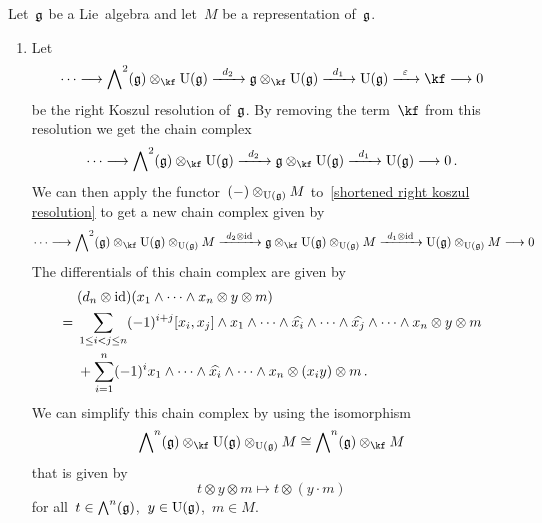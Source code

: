 \begin{construction}
	\label{lie algebra homology and cohomology via koszul complex}
	Let~$\mathfrak{g}$ be a Lie~algebra and let~$M$ be a representation of~$\mathfrak{g}$.
	\begin{enumerate}
		\item
			Let
			\[
				\dotsb
				\to
				\Exterior^2(\glie) \otimes_{\kf} \Univ(\glie)
				\xto{d_2}
				\glie \otimes_{\kf} \Univ(\glie)
				\xto{d_1}
				\Univ(\glie)
				\xto{\varepsilon}
				\kf
				\to
				0
			\]
			be the right Koszul resolution of~$\mathfrak{g}$.
			By removing the term~$\kf$ from this resolution we get the chain complex
			\begin{equation}
				\label{shortened right koszul resolution}
				\dotsb
				\to
				\Exterior^2(\glie) \otimes_{\kf} \Univ(\glie)
				\xto{d_2}
				\glie \otimes_{\kf} \Univ(\glie)
				\xto{d_1}
				\Univ(\glie)
				\to
				0 \,.
			\end{equation}
			We can then apply the functor~$(-) \otimes_{\operatorname{U}(\mathfrak{g})} M$ to~\eqref{shortened right koszul resolution} to get a new chain complex given by
			\[
				\dotsb
				\to
				\Exterior^2(\glie) \otimes_{\kf} \Univ(\glie) \otimes_{\Univ(\glie)} M
				\xto{\! d_2 \otimes \id \!}
				\glie \otimes_{\kf} \Univ(\glie) \otimes_{\Univ(\glie)} M
				\xto{\! d_1 \otimes \id\! }
				\Univ(\glie) \otimes_{\Univ(\glie)} M
				\to
				0
			\]
			The differentials of this chain complex are given by
			\begin{align*}
				{}&
				(d_n \otimes \mathrm{id})(x_1 \wedge \dotsb \wedge x_n \otimes y \otimes m)
				\\
				={}&
				\sum_{1 \leq i < j \leq n}
				(-1)^{i+j}
				[x_i, x_j] \wedge x_1 \wedge \dotsb \wedge \widehat{x_i} \wedge \dotsb \wedge \widehat{x_j} \wedge \dotsb \wedge x_n
				\otimes y \otimes m
				\\
				{}&
				+
				\sum_{i=1}^n
				(-1)^i
				x_1 \wedge \dotsb \wedge \widehat{x_i} \wedge \dotsb \wedge x_n \otimes (x_i y) \otimes m \,.
			\end{align*}
			We can simplify this chain complex by using the isomorphism
			\begin{equation}
				\label{isomorphism for triple tensor product}
				\Exterior^n(\glie) \otimes_{\kf} \Univ(\glie) \otimes_{\Univ(\glie)} M
				\cong
				\Exterior^n(\glie) \otimes_{\kf} M
			\end{equation}
			that is given by
			\[
				t \otimes y \otimes m
				\mapsto
				t \otimes (y \cdot m)
			\]
			for all~$t \in \operatorname{\bigwedge}^n(\mathfrak{g})$,~$y \in \operatorname{U}(\mathfrak{g})$,~$m \in M$.

\end{enumerate}
\end{construction}
